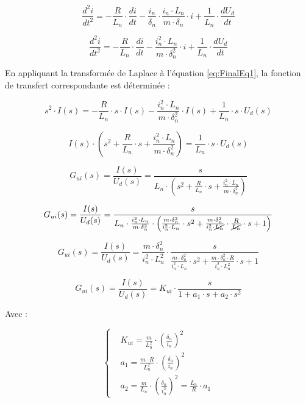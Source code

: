 $$    \frac{d^2i}{dt^2} = -\frac{R}{L_n} \cdot \frac{di}{dt} - \frac{i_n}{\delta_n}\cdot\frac{i_n\cdot L_n}{m \cdot\delta_n}\cdot i + \frac{1}{L_n}\cdot \frac{dU_d}{dt}$$

\begin{equation}
    \frac{d^2i}{dt^2} = -\frac{R}{L_n} \cdot \frac{di}{dt} - \frac{i_n^2\cdot L_n}{m \cdot\delta_n^2}\cdot i + \frac{1}{L_n}\cdot \frac{dU_d}{dt}
    \label{eq:FinalEq1}
\end{equation}

En appliquant la transformée de Laplace à l'équation \ref{eq:FinalEq1}, la fonction de transfert correspondante est déterminée :

$$ s^2\cdot I(s) = -\frac{R}{L_n} \cdot s\cdot I(s) - \frac{i_n^2\cdot L_n}{m \cdot\delta_n^2}\cdot I(s) + \frac{1}{L_n}\cdot s\cdot U_d(s) $$

$$ I(s)\cdot \left( s^2 + \frac{R}{L_n} \cdot s + \frac{i_n^2\cdot L_n}{m \cdot\delta_n^2}\right) = \frac{1}{L_n}\cdot s\cdot U_d(s) $$

$$ G_{ui}(s) = \frac{I(s)}{U_d(s)} = \frac{s}{L_n\cdot \left( s^2 + \frac{R}{L_n} \cdot s + \frac{i_n^2\cdot L_n}{m \cdot\delta_n^2}\right)}$$

$$ G_{ui}(s) = \frac{I(s)}{U_d(s)} = \frac{s}{L_n\cdot\frac{i_n^2\cdot L_n}{m \cdot\delta_n^2}\cdot\left(\frac{m\cdot\delta_n^2}{i_n^2\cdot L_n}\cdot s^2 + \frac{m\cdot\delta_n^2}{i_n^2\cdot \cancel{L_n}}\cdot\frac{R}{\cancel{L_n}} \cdot s + 1 \right)}$$

$$ G_{ui}(s) = \frac{I(s)}{U_d(s)} = \frac{m \cdot\delta_n^2}{i_n^2\cdot L_n^2}\cdot\frac{s}{ \frac{m\cdot\delta_n^2}{i_n^2\cdot L_n}\cdot s^2 + \frac{m\cdot\delta_n^2\cdot R}{i_n^2\cdot L_n^2} \cdot s + 1}$$

\begin{equation}
    G_{ui}(s) = \frac{I(s)}{U_d(s)} = K_{ui}\cdot\frac{s}{1 + a_1 \cdot s + a_2\cdot s^2}
\end{equation}

Avec :

\begin{equation*}
    \left\{ \begin{aligned}
         & K_{ui} = \frac{m}{L_n^2}\cdot \left(\frac{\delta_n}{i_n} \right)^2                     \\
         & a_1 = \frac{m\cdot R}{L_n^2}\cdot \left(\frac{\delta_n}{i_n} \right)^2                 \\
         & a_2 = \frac{m}{L_n}\cdot\left(\frac{\delta_n}{i_n^2}\right)^2 = \frac{L_n}{R}\cdot a_1
    \end{aligned} \right.
\end{equation*}

